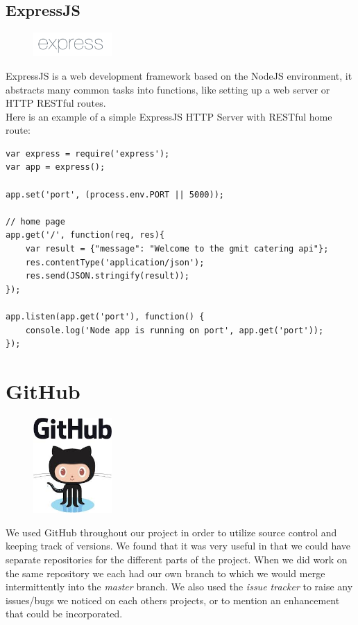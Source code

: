 \subsection{ExpressJS}
\begin{figure}
\includegraphics[width=3cm]{img/mobile-app/logos/express.png}
\end{figure} 
ExpressJS \cite{expressjs} is a web development framework based on the NodeJS environment, it abstracts many common tasks into functions, like setting up a web server or HTTP RESTful routes.
\\
Here is an example of a simple ExpressJS HTTP Server with RESTful home route:
\begin{verbatim}
var express = require('express');
var app = express();

app.set('port', (process.env.PORT || 5000));

// home page
app.get('/', function(req, res){
    var result = {"message": "Welcome to the gmit catering api"};
    res.contentType('application/json');
    res.send(JSON.stringify(result));
});

app.listen(app.get('port'), function() {
    console.log('Node app is running on port', app.get('port'));
});
\end{verbatim}

  \section{GitHub}
  \begin{figure}
  	\includegraphics[width=3cm]{img/zf2/github-logo.png}
  \end{figure} 
  We used GitHub \cite{github} throughout our project in order to utilize source control and keeping track of versions.
  We found that it was very useful in that we could have separate repositories for the different parts of the project.
  When we did work on the same repository we each had our own branch to which we would merge intermittently into the \textit{master} branch.
  We also used the \textit{issue tracker} to raise any issues/bugs we noticed on each others projects, or to mention an enhancement that could be incorporated.
  
